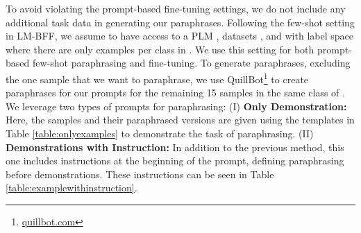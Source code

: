 \documentclass[11pt]{article}
\begin{document}
To avoid violating the prompt-based fine-tuning settings, we do not include any additional task data in generating our paraphrases. Following the few-shot setting in LM-BFF, we assume to have access to a PLM , datasets , and  with label space  where there are only  examples per class in . We use this setting for both prompt-based few-shot paraphrasing and fine-tuning. To generate paraphrases, excluding the one sample that we want to paraphrase, we use QuillBot\footnote{\url{quillbot.com}} to create paraphrases for our prompts for the remaining 15 samples in the same class of . We leverage two types of prompts for paraphrasing:
    (I) \textbf{Only Demonstration:} Here, the samples and their paraphrased versions are given using the templates in Table \ref{table:onlyexamples} to demonstrate the task of paraphrasing. 
    (II) \textbf{Demonstrations with Instruction:} In addition to the previous method, this one includes instructions at the beginning of the prompt, defining paraphrasing before demonstrations. These instructions can be seen in Table \ref{table:examplewithinstruction}.
\end{document}
